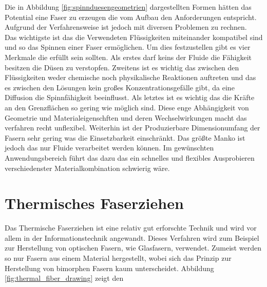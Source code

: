 Die in Abbildung \ref{fig:spinnduesengeometrien} dargestellten Formen hätten das Potential eine Faser zu erzeugen die vom Aufbau den Anforderungen entspricht. Aufgrund der Verfahrensweise ist jedoch mit diversen Problemen zu rechnen.  \\
Das wichtigste ist das die Verwendeten Flüssigkeiten miteinander kompatibel sind und so das Spinnen einer Faser ermöglichen. Um dies festzustellen gibt es vier Merkmale die erfüllt sein sollten. Als erstes darf keins der Fluide die Fähigkeit besitzen die Düsen zu verstopfen. Zweitens ist es wichtig das zwischen den Flüssigkeiten weder chemische noch physikalische Reaktionen auftreten und das es zwischen den Lösungen kein großes Konzentrationsgefälle gibt, da eine Diffusion die Spinnfähigkeit beeinflusst. Als letztes ist es wichtig das die Kräfte an den Grenzflächen so gering wie möglich sind\cite{Yu.2020}.
Diese enge Abhängigkeit von Geometrie und Materialeigenschften und deren Wechselwirkungen macht das verfahren recht unflexibel. Weiterhin ist der Produzierbare Dimensionumfang der Fasern sehr gering was die Einsetzbarkeit einschränkt. Das größte Manko ist jedoch das nur Fluide verarbeitet werden können. Im gewünschten Anwendungsbereich führt das dazu das ein schnelles und flexibles Ausprobieren verschiedenster Materialkombination schwierig wäre.


\section{Thermisches Faserziehen} \label{sec:therm}

Das Thermische Faserziehen ist eine relativ gut erforschte Technik und wird vor allem in der Informationstechnik angewandt. Dieses Verfahren wird zum Beispiel zur Herstellung von optischen Fasern, wie Glasfasern, verwendet. Zumeist werden so nur Fasern aus einem Material hergestellt, wobei sich das Prinzip zur Herstellung von bimorphen Fasern kaum unterscheidet. Abbildung \ref{fig:thermal_fiber_drawing} zeigt den 

